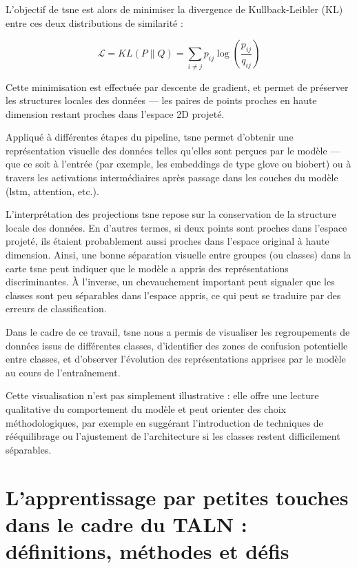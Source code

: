 \documentclass[12pt]{report}
\begin{document}
L’objectif de \gls{tsne} est alors de minimiser la divergence de Kullback-Leibler (KL) entre ces deux distributions de similarité :

\begin{equation}
\mathcal{L} = KL(P \| Q) = \sum_{i \neq j} p_{ij} \log \left( \frac{p_{ij}}{q_{ij}} \right)
\end{equation}

Cette minimisation est effectuée par descente de gradient, et permet de préserver les structures locales des données — les paires de points proches en haute dimension restant proches dans l’espace 2D projeté.

Appliqué à différentes étapes du pipeline, \gls{tsne} permet d’obtenir une représentation visuelle des données telles qu’elles sont perçues par le modèle — que ce soit à l’entrée (par exemple, les embeddings de type \gls{glove} ou \gls{biobert}) ou à travers les activations intermédiaires après passage dans les couches du modèle (\gls{lstm}, attention, etc.).

L’interprétation des projections \gls{tsne} repose sur la conservation de la structure locale des données. En d’autres termes, si deux points sont proches dans l’espace projeté, ils étaient probablement aussi proches dans l’espace original à haute dimension. Ainsi, une bonne séparation visuelle entre groupes (ou classes) dans la carte \gls{tsne} peut indiquer que le modèle a appris des représentations discriminantes. À l’inverse, un chevauchement important peut signaler que les classes sont peu séparables dans l’espace appris, ce qui peut se traduire par des erreurs de classification.

Dans le cadre de ce travail, \gls{tsne} nous a permis de visualiser les regroupements de données issus de différentes classes, d'identifier des zones de confusion potentielle entre classes, et d'observer l'évolution des représentations apprises par le modèle au cours de l'entraînement.

Cette visualisation n’est pas simplement illustrative : elle offre une lecture qualitative du comportement du modèle et peut orienter des choix méthodologiques, par exemple en suggérant l’introduction de techniques de rééquilibrage ou l’ajustement de l’architecture si les classes restent difficilement séparables.

\section{L'apprentissage par petites touches dans le cadre du TALN : définitions, méthodes et défis}
\end{document}

